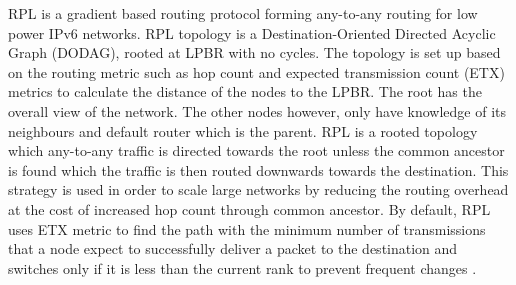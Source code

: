RPL \cite{winter2012rpl} is a gradient based routing protocol forming any-to-any routing for low power IPv6 networks. RPL topology is a Destination-Oriented Directed Acyclic Graph (DODAG), rooted at LPBR with no cycles. The topology is set up based on the routing metric \cite{routingmetrics} such as hop count and expected transmission count (ETX) metrics to calculate the distance of the nodes to the LPBR. The root has the overall view of the network. The other nodes however, only have knowledge of its neighbours and default router which is the parent. RPL is a rooted topology which any-to-any traffic is directed towards the root unless the common ancestor is found which the traffic is then routed downwards towards the destination. This strategy is used in order to scale large networks by reducing the routing overhead at the cost of increased hop count through common ancestor. %
By default, RPL uses ETX metric to find the path with the minimum number of transmissions that a node expect to successfully deliver a packet to the destination and switches only if it is less than the current rank to prevent frequent changes \cite{mrhof}. 





